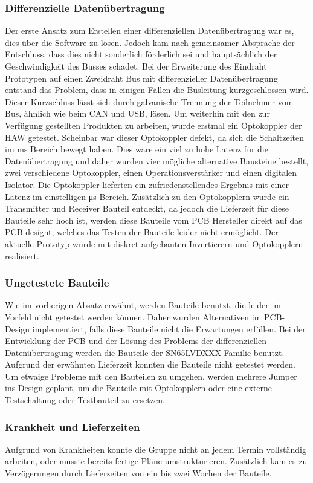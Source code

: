 \subsubsection{Differenzielle Datenübertragung}
Der erste Ansatz zum Erstellen einer differenziellen Datenübertragung war es, dies über die Software zu lösen. Jedoch kam nach gemeinsamer Absprache der Entschluss, dass dies nicht sonderlich förderlich sei und hauptsächlich der Geschwindigkeit des Busses schadet. Bei der Erweiterung des Eindraht Prototypen auf einen Zweidraht Bus mit differenzieller Datenübertragung entstand das Problem, dass in einigen Fällen die Busleitung kurzgeschlossen wird. Dieser Kurzschluss lässt sich durch galvanische Trennung der Teilnehmer vom Bus, ähnlich wie beim CAN und USB, lösen. Um weiterhin mit den zur Verfügung gestellten Produkten zu arbeiten, wurde erstmal ein Optokoppler der HAW getestet. Scheinbar war dieser Optokoppler defekt, da sich die Schaltzeiten im \si{ms} Bereich bewegt haben. Dies wäre ein viel zu hohe Latenz für die Datenübertragung und daher wurden vier mögliche alternative Bausteine bestellt, zwei verschiedene Optokoppler, einen Operationsverstärker und einen digitalen Isolator. Die Optokoppler lieferten ein zufriedenstellendes Ergebnis mit einer Latenz im einstelligen \si{\micro\second} Bereich. Zusätzlich zu den Optokopplern wurde ein Transmitter und Receiver Bauteil entdeckt, da jedoch die Lieferzeit für diese Bauteile sehr hoch ist, werden diese Bauteile vom PCB Hersteller direkt auf das PCB designt, welches das Testen der Bauteile leider nicht ermöglicht. Der aktuelle Prototyp wurde mit diskret aufgebauten Invertierern und Optokopplern realisiert.

\subsubsection{Ungetestete Bauteile}
Wie im vorherigen Absatz erwähnt, werden Bauteile benutzt, die leider im Vorfeld nicht getestet werden können. Daher wurden Alternativen im PCB-Design implementiert, falls diese Bauteile nicht die Erwartungen erfüllen. Bei der Entwicklung der PCB und der Lösung des Problems der differenziellen Datenübertragung werden die Bauteile der SN65LVDXXX Familie benutzt. Aufgrund der erwähnten Lieferzeit konnten die Bauteile nicht getestet werden. Um etwaige Probleme mit den Bauteilen zu umgehen, werden mehrere Jumper ins Design geplant, um die Bauteile mit Optokopplern oder eine externe Testschaltung oder Testbauteil zu ersetzen.

\subsubsection{Krankheit und Lieferzeiten}
Aufgrund von Krankheiten konnte die Gruppe nicht an jedem Termin vollständig arbeiten, oder musste bereits fertige Pläne umstrukturieren. Zusätzlich kam es zu Verzögerungen durch Lieferzeiten von ein bis zwei Wochen der Bauteile.

